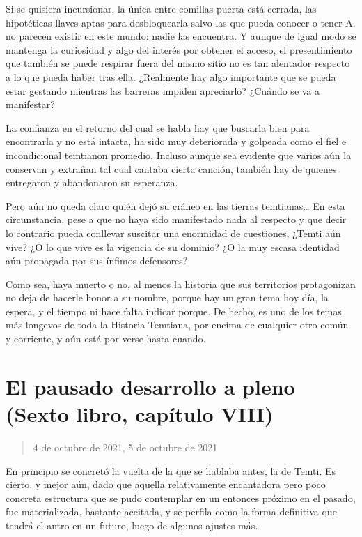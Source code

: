 \documentclass[
  spanish,
]{book}
\begin{document}
Si se quisiera incursionar, la única entre comillas puerta está cerrada, las hipotéticas llaves aptas para desbloquearla salvo las que pueda conocer o tener A. no parecen existir en este mundo: nadie las encuentra. Y aunque de igual modo se mantenga la curiosidad y algo del interés por obtener el acceso, el presentimiento que también se puede respirar fuera del mismo sitio no es tan alentador respecto a lo que pueda haber tras ella. ¿Realmente hay algo importante que se pueda estar gestando mientras las barreras impiden apreciarlo? ¿Cuándo se va a manifestar?

La confianza en el retorno del cual se habla hay que buscarla bien para encontrarla y no está intacta, ha sido muy deteriorada y golpeada como el fiel e incondicional temtianon promedio. Incluso aunque sea evidente que varios aún la conservan y extrañan tal cual cantaba cierta canción, también hay de quienes entregaron y abandonaron su esperanza.

Pero aún no queda claro quién dejó su cráneo en las tierras temtianas\ldots{} En esta circunstancia, pese a que no haya sido manifestado nada al respecto y que decir lo contrario pueda conllevar suscitar una enormidad de cuestiones, ¿Temti aún vive? ¿O lo que vive es la vigencia de su dominio? ¿O la muy escasa identidad aún propagada por sus ínfimos defensores?

Como sea, haya muerto o no, al menos la historia que sus territorios protagonizan no deja de hacerle honor a su nombre, porque hay un gran tema hoy día, la espera, y el tiempo ni hace falta indicar porque. De hecho, es uno de los temas más longevos de toda la Historia Temtiana, por encima de cualquier otro común y corriente, y aún está por verse hasta cuando.

\hypertarget{el-pausado-desarrollo-a-pleno-sexto-libro-capuxedtulo-viii}{%
\section{El pausado desarrollo a pleno (Sexto libro, capítulo VIII)}\label{el-pausado-desarrollo-a-pleno-sexto-libro-capuxedtulo-viii}}

\begin{quote}
4 de octubre de 2021, 5 de octubre de 2021
\end{quote}

En principio se concretó la vuelta de la que se hablaba antes, la de Temti. Es cierto, y mejor aún, dado que aquella relativamente encantadora pero poco concreta estructura que se pudo contemplar en un entonces próximo en el pasado, fue materializada, bastante aceitada, y se perfila como la forma definitiva que tendrá el antro en un futuro, luego de algunos ajustes más.
\end{document}
